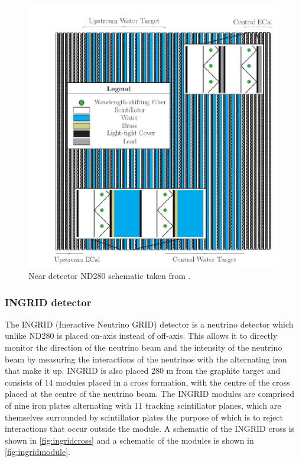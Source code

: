 \begin{figure}
    \includegraphics[width=\textwidth]{Figures/p0d.png}
    \caption{Near detector ND280 schematic taken from \cite{t2kcollaborationT2KExperiment2011}.}
\label{fig:p0d}
\end{figure}

\subsubsection{INGRID detector}

The INGRID (Ineractive Neutrino GRID) detector is a neutrino detector which unlike ND280 is placed on-axis instead of off-axis. This allows it to directly monitor the direction of the neutrino beam and the intensity of the neutrino beam by measuring the interactions of the neutrinos with the alternating iron that make it up. INGRID is also placed 280 m from the graphite target and consists of 14 modules placed in a cross formation, with the centre of the cross placed at the centre of the neutrino beam. The INGRID modules are comprised of nine iron plates alternating with 11 tracking scintillator planes, which are themselves surrounded by scintillator plates the purpose of which is to reject interactions that occur outside the module. A schematic of the INGRID cross is shown in \ref{fig:ingridcross} and a schematic of the modules is shown in \ref{fig:ingridmodule}. 

